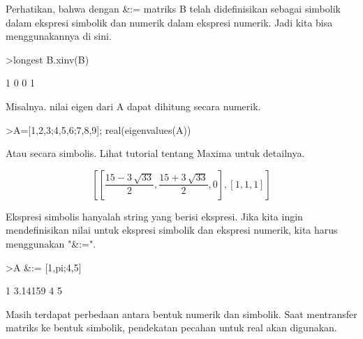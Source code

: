 \documentclass[a4paper,10pt]{article}
\begin{document}
\begin{eulernotebook}
\begin{eulercomment}
\begin{eulercomment}
\begin{eulercomment}
\begin{eulercomment}
\begin{eulercomment}
\begin{eulercomment}
\begin{eulercomment}
Perhatikan, bahwa dengan \&:= matriks B telah didefinisikan sebagai
simbolik dalam ekspresi simbolik dan numerik dalam ekspresi numerik.
Jadi kita bisa menggunakannya di sini.
\end{eulercomment}
\begin{eulerprompt}
>longest B.xinv(B)
\end{eulerprompt}
\begin{euleroutput}
                        1                       0 
                        0                       1 
\end{euleroutput}
\begin{eulercomment}
Misalnya. nilai eigen dari A dapat dihitung secara numerik.
\end{eulercomment}
\begin{eulerprompt}
>A=[1,2,3;4,5,6;7,8,9]; real(eigenvalues(A))
\end{eulerprompt}
\begin{euleroutput}
  [16.1168,  -1.11684,  0]
\end{euleroutput}
\begin{eulercomment}
Atau secara simbolis. Lihat tutorial tentang Maxima untuk detailnya.
\end{eulercomment}
\begin{eulerformula}
\[
\left[ \left[ \frac{15-3\,\sqrt{33}}{2} , \frac{15+3\,\sqrt{33}}{2}   , 0 \right]  , \left[ 1 , 1 , 1 \right]  \right] 
\]
\end{eulerformula}
\begin{eulercomment}
Ekspresi simbolis hanyalah string yang berisi ekspresi. Jika kita
ingin mendefinisikan nilai untuk ekspresi simbolik dan ekspresi
numerik, kita harus menggunakan "\&:=".
\end{eulercomment}
\begin{eulerprompt}
>A &:= [1,pi;4,5]
\end{eulerprompt}
\begin{euleroutput}
              1       3.14159 
              4             5 
\end{euleroutput}
\begin{eulercomment}
Masih terdapat perbedaan antara bentuk numerik dan simbolik. Saat
mentransfer matriks ke bentuk simbolik, pendekatan pecahan untuk real
akan digunakan.
\end{eulercomment}
\begin{eulerprompt}

\end{eulerprompt}
\end{eulercomment}
\end{eulercomment}
\end{eulercomment}
\end{eulercomment}
\end{eulercomment}
\end{eulercomment}
\end{eulernotebook}
\end{document}
